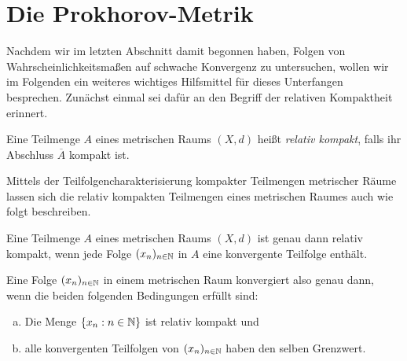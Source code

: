 \section{Die Prokhorov-Metrik}
Nachdem wir im letzten Abschnitt damit begonnen haben, Folgen von Wahrscheinlichkeitsmaßen auf schwache Konvergenz zu untersuchen, wollen wir im Folgenden ein weiteres wichtiges Hilfsmittel für dieses Unterfangen besprechen.
Zunächst einmal sei dafür an den Begriff der relativen Kompaktheit erinnert. 
\begin{mydef}
    Eine Teilmenge $A$ eines metrischen Raums $(X,d)$ heißt \textit{relativ kompakt}, falls ihr Abschluss $\overline{A}$ kompakt ist. 
\end{mydef}
Mittels der Teilfolgencharakterisierung kompakter Teilmengen metrischer Räume lassen sich die relativ kompakten Teilmengen eines metrischen Raumes auch wie folgt beschreiben.

\begin{proposition}
    Eine Teilmenge $A$ eines metrischen Raums $(X,d)$ ist genau dann relativ kompakt, wenn jede Folge $(x_n)_{n \in \mathbb{N}}$ in $A$ eine konvergente Teilfolge enthält.
\end{proposition}
Eine Folge $(x_n)_{n \in \mathbb{N}}$ in einem metrischen Raum konvergiert also genau dann, wenn die beiden folgenden Bedingungen erfüllt sind:
\begin{enumerate}[(a)]
    \item Die Menge $\{x_n : n \in \mathbb{N} \}$ ist relativ kompakt und
    \item alle konvergenten Teilfolgen von $(x_n)_{n \in \mathbb{N}}$ haben den selben Grenzwert. 
\end{enumerate}

